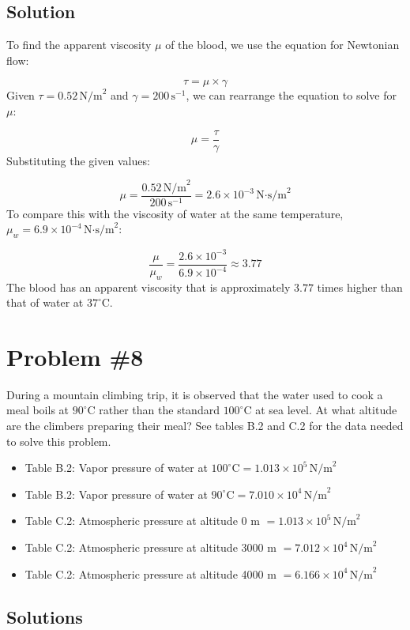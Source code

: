 \documentclass{article}
\begin{document}
\subsection*{Solution}
To find the apparent viscosity \( \mu \) of the blood, we use the equation for Newtonian flow:

\[
\tau = \mu \times \gamma
\]
Given \( \tau = 0.52 \, \text{N/m}^2\) and \( \gamma = 200 \, \text{s}^{-1}\), we can rearrange the equation to solve for \( \mu \):

\[
\mu = \frac{\tau}{\gamma}
\]
Substituting the given values:

\[
\mu = \frac{0.52 \, \text{N/m}^2}{200 \, \text{s}^{-1}} = 2.6 \times 10^{-3} \, \text{N·s/m}^2
\]
To compare this with the viscosity of water at the same temperature, \( \mu_w = 6.9 \times 10^{-4} \, \text{N·s/m}^2\):

\[
\frac{\mu}{\mu_w} = \frac{2.6 \times 10^{-3}}{6.9 \times 10^{-4}} \approx 3.77
\]
The blood has an apparent viscosity that is approximately \(3.77\) times higher than that of water at \(37^\circ \text{C}\).
\newpage
\section*{Problem \#8}

During a mountain climbing trip, it is observed that the water used to cook a meal boils at \(90^\circ \text{C}\) rather than the standard \(100^\circ \text{C}\) at sea level. At what altitude are the climbers preparing their meal? See tables B.2 and C.2 for the data needed to solve this problem.

\begin{itemize}
  \item Table B.2: Vapor pressure of water at \(100^\circ \text{C} = 1.013 \times 10^5 \, \text{N/m}^2\)
  \item Table B.2: Vapor pressure of water at \(90^\circ \text{C} = 7.010 \times 10^4 \, \text{N/m}^2\)
  \item Table C.2: Atmospheric pressure at altitude 0 m \(= 1.013 \times 10^5 \, \text{N/m}^2\)
  \item Table C.2: Atmospheric pressure at altitude 3000 m \(= 7.012 \times 10^4 \, \text{N/m}^2\)
  \item Table C.2: Atmospheric pressure at altitude 4000 m \(= 6.166 \times 10^4 \, \text{N/m}^2\)
\end{itemize}

\subsection*{Solutions}
\end{document}
